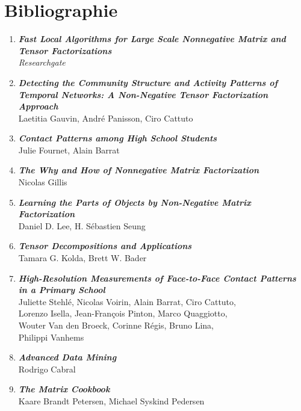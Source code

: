\documentclass{article}
\begin{document}
\section{Bibliographie}
\begin{enumerate}
    \item \textbf{\textit{Fast Local Algorithms for Large Scale Nonnegative Matrix and Tensor Factorizations}} \\
    \textit{Researchgate}
    
    \item \textbf{\textit{Detecting the Community Structure and Activity Patterns of Temporal Networks: A Non-Negative Tensor Factorization Approach}} \\
    Laetitia Gauvin, André Panisson, Ciro Cattuto
    
    \item \textbf{\textit{Contact Patterns among High School Students}} \\
    Julie Fournet, Alain Barrat
    
    \item \textbf{\textit{The Why and How of Nonnegative Matrix Factorization}} \\
    Nicolas Gillis
    
    \item \textbf{\textit{Learning the Parts of Objects by Non-Negative Matrix Factorization}} \\
    Daniel D. Lee, H. Sébastien Seung
    
    \item \textbf{\textit{Tensor Decompositions and Applications}} \\
    Tamara G. Kolda, Brett W. Bader
    
    \item \textbf{\textit{High-Resolution Measurements of Face-to-Face Contact Patterns in a Primary School}} \\
    Juliette Stehlé, Nicolas Voirin, Alain Barrat, Ciro Cattuto, \\
    Lorenzo Isella, Jean-François Pinton, Marco Quaggiotto, \\
    Wouter Van den Broeck, Corinne Régis, Bruno Lina, \\
    Philippi Vanhems
    
    \item \textbf{\textit{Advanced Data Mining}} \\
    Rodrigo Cabral
    
    \item \textbf{\textit{The Matrix Cookbook}} \\
    Kaare Brandt Petersen, Michael Syskind Pedersen
\end{enumerate}
\end{document}
